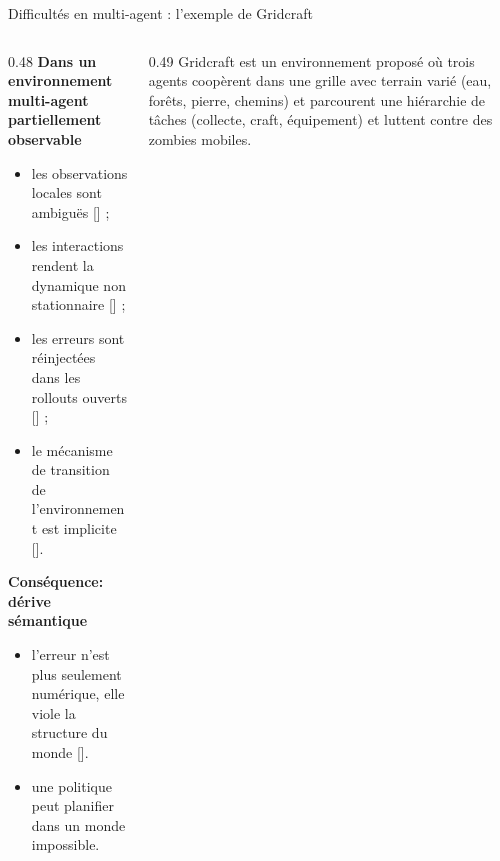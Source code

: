 \documentclass[aspectratio=169]{beamer}
\newcommand{\scite}[1]{{\normalfont\color{SpaceCyan!60!black}[\citealp{#1}]}}
\begin{document}
\begin{frame}{Difficultés en multi-agent : l'exemple de Gridcraft}
  \begin{columns}[c,totalwidth=\textwidth]
    \begin{column}{0.48\textwidth}
      \scriptsize
      \textbf{Dans un environnement multi-agent partiellement observable}
      \begin{itemize}
        \item les observations locales sont ambiguës \scite{Oliehoek2016} ;
        \item les interactions rendent la dynamique non stationnaire \scite{Wong2023,nekoei2023dealing} ;
        \item les erreurs sont réinjectées dans les rollouts ouverts \scite{talvitie2014modelbias} ;
        \item le mécanisme de transition de l'environnement est implicite \scite{kipf2020contrastivelearningstructuredworld}.
      \end{itemize}
      \textbf{Conséquence: dérive sémantique}
      \begin{itemize}
        \item l'erreur n'est plus seulement numérique,
              elle viole la structure du monde \scite{kipf2020contrastivelearningstructuredworld,talvitie2014modelbias}.
        \item une politique peut planifier dans un monde impossible.
      \end{itemize}
      \vspace{-1cm}
    \end{column}
    \begin{column}{0.49\textwidth}
      \centering
      \centering
      \tiny
      Gridcraft est un environnement proposé où trois agents coopèrent dans une grille avec terrain varié (eau, forêts, pierre, chemins) et parcourent une hiérarchie de tâches (collecte, craft, équipement) et luttent contre des zombies mobiles.
    \end{column}
  \end{columns}
\end{frame}
\end{document}

